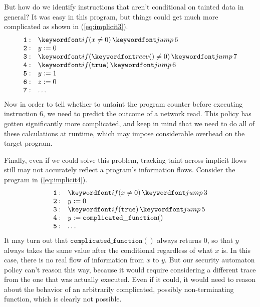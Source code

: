 \documentclass[11pt,twoside]{scrartcl}
\begin{document}
But how do we identify instructions that aren't conditional on tainted data in general? It was easy in this program, but things could get much more complicated as shown in (\ref{eq:implicit3}).
\begin{equation}
\label{eq:implicit3}
\begin{array}{ll}
\mathtt{1:} & \pifjump{x \ne 0}{6} \\
\mathtt{2:} & y := 0 \\
\mathtt{3:} & \pifjump{\precv\mathtt{()} \ne 0}{7} \\
\mathtt{4:} & \pifjump{\mathtt{true}}{6} \\
\mathtt{5:} & y := 1 \\
\mathtt{6:} & z := 0 \\
\mathtt{7:} & \ldots
\end{array}
\end{equation}
Now in order to tell whether to untaint the program counter before executing instruction 6, we need to predict the outcome of a network read. This policy has gotten significantly more complicated, and keep in mind that we need to do all of these calculations at runtime, which may impose considerable overhead on the target program.

Finally, even if we could solve this problem, tracking taint across implicit flows still may not accurately reflect a program's information flows. Consider the program in (\ref{eq:implicit4}).
\begin{equation}
\label{eq:implicit1}
\begin{array}{ll}
\mathtt{1:} & \pifjump{x \ne 0}{3} \\
\mathtt{2:} & y := 0 \\
\mathtt{3:} & \pifjump{\mathtt{true}}{5} \\
\mathtt{4:} & y := \mathtt{complicated\_function()} \\
\mathtt{5:} & \ldots
\end{array}
\end{equation}
It may turn out that $\mathtt{complicated\_function()}$ always returns 0, so that $y$ always takes the same value after the conditional regardless of what $x$ is. In this case, there is no real flow of information from $x$ to $y$. But our security automaton policy can't reason this way, because it would require considering a different trace from the one that was actually executed. Even if it could, it would need to reason about the behavior of an arbitrarily complicated, possibly non-terminating function, which is clearly not possible.
\end{document}
